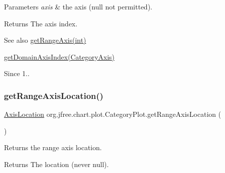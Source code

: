 \begin{DoxyParams}{Parameters}
{\em axis} & the axis ({\ttfamily null} not permitted).\\
\hline
\end{DoxyParams}
\begin{DoxyReturn}{Returns}
The axis index.
\end{DoxyReturn}
\begin{DoxySeeAlso}{See also}
\mbox{\hyperlink{classorg_1_1jfree_1_1chart_1_1plot_1_1_category_plot_a2b2f8a011636e469d20c314698e1a98d}{get\+Range\+Axis(int)}} 

\mbox{\hyperlink{classorg_1_1jfree_1_1chart_1_1plot_1_1_category_plot_a1d89a58f4537d598f6eaec10a7b12516}{get\+Domain\+Axis\+Index(\+Category\+Axis)}}
\end{DoxySeeAlso}
\begin{DoxySince}{Since}
1.. 
\end{DoxySince}
\mbox{\label{classorg_1_1jfree_1_1chart_1_1plot_1_1_category_plot_ae66bc6fd3a43e9a1de43d845ecc4f919}} 
\subsubsection{\texorpdfstring{get\+Range\+Axis\+Location()}{getRangeAxisLocation()}\hspace{0.1cm}{\footnotesize\ttfamily [1/2]}}
{\footnotesize\ttfamily \mbox{\hyperlink{classorg_1_1jfree_1_1chart_1_1axis_1_1_axis_location}{Axis\+Location}} org.\+jfree.\+chart.\+plot.\+Category\+Plot.\+get\+Range\+Axis\+Location (\begin{DoxyParamCaption}{ }\end{DoxyParamCaption})}

Returns the range axis location.

\begin{DoxyReturn}{Returns}
The location (never {\ttfamily null}). 
\end{DoxyReturn}
\mbox{\label{classorg_1_1jfree_1_1chart_1_1plot_1_1_category_plot_a1f8ff2c95bc3306523a6713d0e1f6e67}} 

